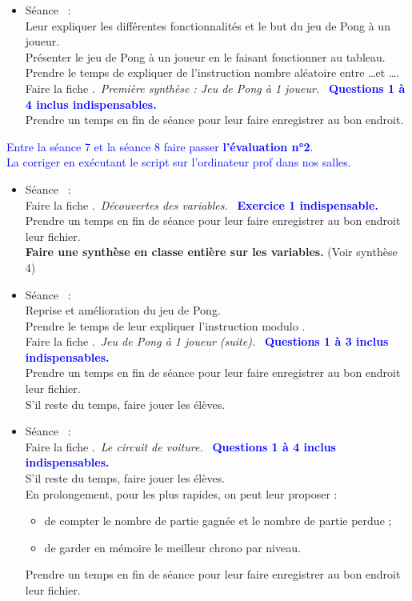\documentclass[12pt,a4paper]{article} %
\newcounter{num}
\newcommand{\seance}{\stepcounter{num} Séance \thenum \, : \\}
\newcounter{fiche}
\newcommand{\fiche}{\stepcounter{fiche} Faire la fiche \thefiche. \,}
\begin{document}
\begin{itemize}
\begin{itemize}
\textbf{Faire une synthèse en classe entière sur les conditions.} (Voir synthèse 3) \vspace{3pt}
\item[\textbullet] 
\seance
Leur expliquer les différentes fonctionnalités et le but du jeu de Pong à un joueur. \\
Présenter le jeu de Pong à un joueur en le faisant fonctionner au tableau.\\
Prendre le temps de expliquer de l'instruction \og nombre aléatoire entre \dots et \dots \fg{}. \\
\fiche \textit{Première synthèse : Jeu de Pong à 1 joueur.} \, \textcolor{blue}{\textbf{Questions 1 à 4 inclus indispensables.}} \\
Prendre un temps en fin de séance pour leur faire enregistrer au bon endroit.
\vspace{3pt}
\end{itemize}
\textcolor{blue}{Entre la séance 7 et la séance 8 faire passer \textbf{l'évaluation n°2}. \\
La corriger en exécutant le script sur l'ordinateur prof dans nos salles.} \vspace{3pt}
\begin{itemize}
\item[\textbullet] 
\seance
\fiche \textit{Découvertes des variables.} \, \textcolor{blue}{\textbf{Exercice 1 indispensable.}} \\
Prendre un temps en fin de séance pour leur faire enregistrer au bon endroit leur fichier. \\
\textbf{Faire une synthèse en classe entière sur les variables.} (Voir synthèse 4) \vspace{3pt}
\item[\textbullet] 
\seance
Reprise et amélioration du jeu de Pong. \\
Prendre le temps de leur expliquer l'instruction \og modulo \fg{}. \\
\fiche \textit{Jeu de Pong à 1 joueur (suite).} \, \textcolor{blue}{\textbf{Questions 1 à 3 inclus indispensables.}} \\
Prendre un temps en fin de séance pour leur faire enregistrer au bon endroit leur fichier. \\
S'il reste du temps, faire jouer les élèves. \vspace{3pt}
\item[\textbullet] 
\seance 
\fiche \textit{Le circuit de voiture.} \, \textcolor{blue}{\textbf{Questions 1 à 4 inclus indispensables.}} \\
S'il reste du temps, faire jouer les élèves. \\
En prolongement, pour les plus rapides, on peut leur proposer :
\begin{itemize}
\item
de compter le nombre de partie gagnée et le nombre de partie perdue ;
\item
de garder en mémoire le meilleur chrono par niveau.
\end{itemize} 
Prendre un temps en fin de séance pour leur faire enregistrer au bon endroit leur fichier. \vspace{3pt}
\end{itemize}
\end{itemize}
\end{document}
